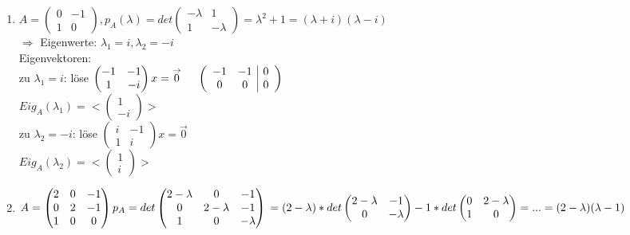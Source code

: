 \documentclass[a4paper,11pt]{article}
\begin{document}
\begin{enumerate}[label=\alph*)]
\item$A=\begin{pmatrix}0&-1\\1&0\end{pmatrix},p_A(\lambda)=det\begin{pmatrix}-\lambda&1\\1&-\lambda\end{pmatrix}=\lambda^2+1=(\lambda+i)(\lambda-i)$ \\
$\Rightarrow$ Eigenwerte: $\lambda_1=i,\lambda_2=-i$ \\
Eigenvektoren: \\
zu $\lambda_1=i$: löse $\begin{pmatrix}-1&-1\\1&-i\end{pmatrix}x=\overset{\rightarrow}{0}\hspace{5mm}\left(\begin{array}{cc|c}-1&-1&0\\0&0&0\end{array}\right)$ \\
$Eig_A(\lambda_1)=<\begin{pmatrix}1\\-i\end{pmatrix}>$ \\
zu $\lambda_2=-i$: löse $\begin{pmatrix}i&-1\\1&i\end{pmatrix}x=\overset{\rightarrow}{0}$ \\
$Eig_A(\lambda_2)=<\begin{pmatrix}1\\i\end{pmatrix}>$
\item $A=\begin{pmatrix}2&0&-1\\0&2&-1\\1&0&0\end{pmatrix} p_A=det\begin{pmatrix}2-\lambda&0&-1\\0&2-\lambda&-1\\1&0&-\lambda\end{pmatrix} \\
=(2-\lambda)*det\begin{pmatrix}2-\lambda&-1\\0&-\lambda\end{pmatrix}-1*det\begin{pmatrix}0&2-\lambda\\1&0\end{pmatrix}=...=(2-\lambda)(\lambda-1)$ \\

\end{enumerate}
\end{document}
